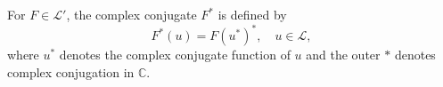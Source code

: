 For $F \in \mathcal{L}'$, the complex conjugate $F^*$ is defined by
$$F^*(u) = F(u^*)^*, \quad u \in \mathcal{L},$$
where $u^*$ denotes the complex conjugate function of $u$ and the outer $*$ denotes complex conjugation in $\mathbb{C}$.
